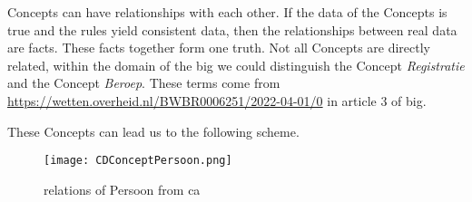 Concepts can have relationships with each other.
If the data of the Concepts is true and the rules yield consistent data, then the relationships between real data are facts.
These facts together form one truth.
Not all Concepts are directly related, within the domain of the \acrshort{big} we could distinguish the Concept \textit{Registratie} and the Concept \textit{Beroep}.
These terms come from \url{https://wetten.overheid.nl/BWBR0006251/2022-04-01/0} in article 3 of \acrshort{big}.
\begin{comment}


Even the name of the relationship is mentioned in this article, which the legislator calls a  \textit{beroepsbeoefenaar}. 
The law requires that details of the \textit{registratie} be recorded, stating the corresponding profession.
In Ampersand this is modeled as follows.
On the one hand the \textit{beroep} and also the Concept \textit{registratie}, see listing~\ref{lst:registratie} rows 16-20.

Between the \textit{registratie} and the \textit{persoon} exists the relationship \textit{beroepsbeoefenaar}, see listing~\ref{list:relatie_beroepsbeoefenaar}.
\begin{lstlisting}[language=Octave, caption={Listing RELATION "beroepsbeoefenaar" },captionpos=b, label={list:relatie_beroepsbeoefenaar}] 
RELATION beroepsbeoefenaar [Persoon*Registratie] 
MEANING "geregistreerd persoon"
POPULATION beroepsbeoefenaar CONTAINS 
[
  ("Piet",1);
  ("Susan",2);
  ("Gerard",3);
  ("John",4)
]\end{lstlisting}
By adding the Concepts of \textit{persoon} (see listing~\ref{list:Concept_persoon}) and \textit{handeling} (see listing~\ref{list:Concept_handeling}), people may perform  medical actions, but only when they are qualified.
\begin{lstlisting}[language=Octave, caption={Listing Concept Persoon },captionpos=b, label={list:Concept_persoon}] 
    Concept Persoon "Persoon die werkzaam wilt zijn binnen de zorg"
    PURPOSE Concept Persoon 
    {+Vastleggen van de identiteit van de persoon+}
\end{lstlisting}
\begin{lstlisting}[language=Octave, caption={Listing Concept Handeling },captionpos=b, label={list:Concept_handeling}] 
    Concept Handeling "Acties die uitgevoerd worden" 
    PURPOSE Concept Handeling 
    {+Vastleggen van de mogelijke handelingen die uitgevoerd kunnen worden binnen de zorg+}
\end{lstlisting}
\end{comment}
These Concepts can lead us to the following scheme.
\begin{figure}[H] 
\texttt{[image: CDConceptPersoon.png]}
\centering
\caption{relations of Persoon from \acrshort{ca}}
\label{fig:relations}
\end{figure}



